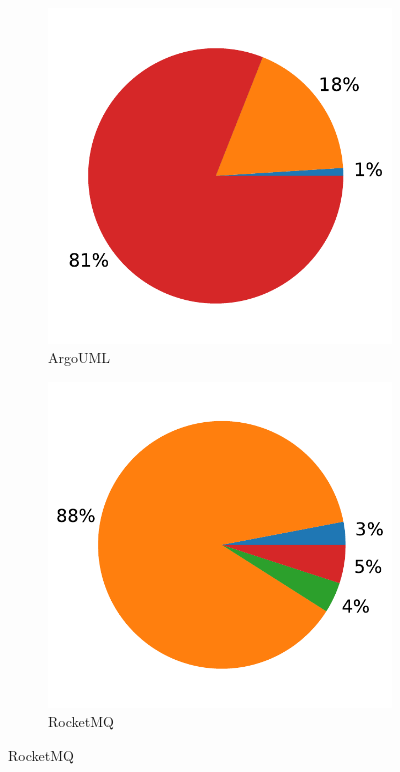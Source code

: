 \begin{figure}[ht!]
    \centering
    \begin{subfigure}[t]{0.44\columnwidth}
        \includegraphics[width=0.8\columnwidth]{figures/chapter5/detectSyn_mod_type_argouml.pdf}
        \caption{ArgoUML}
        \label{fig:detect_syn_mod_type_argouml}
    \end{subfigure}
            \begin{subfigure}[t]{0.44\columnwidth}
        \includegraphics[width=0.8\columnwidth]{figures/chapter5/detectSyn_mod_type_rocketmq.pdf}
        \caption{RocketMQ}
       \label{fig:detect_syn_mod_type_rocketmq}
    \end{subfigure}

\end{figure}
